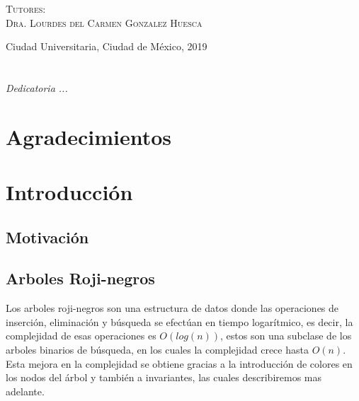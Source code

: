\documentclass[letterpaper,12pt,oneside]{book}
\newcommand{\arns}{arboles roji-negros }
\theoremstyle{plain}
\theoremstyle{definition}
\theoremstyle{remark}
\begin{document}
\begin{titlepage}
\begin{minipage}[c][0.81\textheight][t]{0.75\textwidth}
\begin{center}
\vspace{0.5cm}

{\large\scshape Tutores:\\[0.3cm] {Dra. Lourdes del Carmen Gonzalez Huesca}}\\[.2in]

\vspace{0.5cm}

\large{Ciudad Universitaria, Ciudad de México,}{ }{2019}
\end{center}
\end{minipage}
\end{titlepage}



\frontmatter
\chapter*{}
\begin{flushright}%
\emph{Dedicatoria ...}
\thispagestyle{empty}
\end{flushright}

\chapter{Agradecimientos}

\tableofcontents
\listoffigures


\mainmatter

\chapter{Introducción} 
\section{Motivación}
\section{Arboles Roji-negros}
Los \arns son una estructura de datos donde las operaciones de inserci\'on, eliminaci\'on y búsqueda se efectúan
en tiempo logarítmico, es decir, la complejidad de esas operaciones es $O(log(n))$, estos son una subclase de los
arboles binarios de búsqueda, en los cuales la complejidad crece hasta $O(n)$. Esta mejora en la complejidad se obtiene 
gracias a la introducción de colores en los nodos del \'arbol y también a invariantes, las cuales describiremos 
mas adelante.
\end{document}
